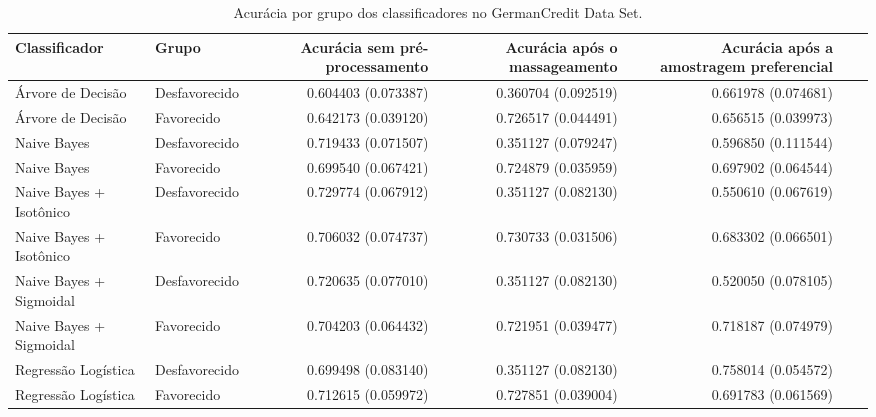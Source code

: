 \begin{table}
    \centering
    \caption{Acurácia por grupo dos classificadores no GermanCredit Data Set.}
    \label{table:grupoGermanCompleto}
    \begin{tabular}{llrrrrr}
    \toprule
    Classificador           &  Grupo        &  Acurácia sem pré-processamento    &  Acurácia após o massageamento  &  Acurácia após a amostragem preferencial  \\    
    \midrule
    Árvore de Decisão       &  Desfavorecido &   0.604403 (0.073387)           &  0.360704 (0.092519)            & 0.661978 (0.074681)   \\
    Árvore de Decisão       &     Favorecido &    0.642173 (0.039120)          &  0.726517 (0.044491)           &  0.656515 (0.039973)      \\    
    Naive Bayes              &  Desfavorecido &   0.719433 (0.071507)           &  0.351127 (0.079247)           &  0.596850 (0.111544)   \\
    Naive Bayes              &     Favorecido &    0.699540 (0.067421)        &  0.724879 (0.035959)             &  0.697902 (0.064544)   \\
    Naive Bayes + Isotônico   &  Desfavorecido &   0.729774 (0.067912)        &  0.351127 (0.082130)              &  0.550610 (0.067619)   \\
    Naive Bayes + Isotônico   &     Favorecido &    0.706032 (0.074737)        &  0.730733 (0.031506)            &  0.683302 (0.066501)    \\
    Naive Bayes + Sigmoidal    &  Desfavorecido &    0.720635 (0.077010)       &  0.351127 (0.082130)                 & 0.520050 (0.078105)     \\
    Naive Bayes + Sigmoidal    &     Favorecido &    0.704203 (0.064432)         &  0.721951 (0.039477)              &   0.718187 (0.074979)      \\
    Regressão Logística        &  Desfavorecido &    0.699498 (0.083140)         &  0.351127 (0.082130)             &  0.758014 (0.054572)      \\
    Regressão Logística        &     Favorecido &   0.712615 (0.059972)         &  0.727851 (0.039004)              &  0.691783 (0.061569)      \\
    \bottomrule
    \end{tabular}
    \end{table}